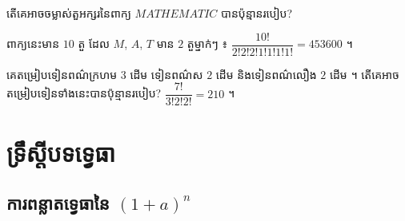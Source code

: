 \begin{example}[លំហាត់គំរូ]
តើគេអាចចម្លាស់តួអក្សរនៃពាក្យ $MATHEMATIC$ បានប៉ុន្មានរបៀប?
\end{example}
\ans
ពាក្យនេះមាន $10$ តួ ដែល $M$, $A$, $T$ មាន $2$ តួម្នាក់ៗ ៖ $\dfrac{10!}{2!2!2!1!1!1!1!} = 453600$ ។

\begin{pro}
គេតម្រៀបទៀនពណ៌ក្រហម $3$ ដើម ទៀនពណ៌ស $2$ ដើម និងទៀនពណ៌លឿង $2$ ដើម ។ តើគេអាចតម្រៀបទៀនទាំងនេះបានប៉ុន្មានរបៀប?
\ans
$\dfrac{7!}{3!2!2!} = 210$ ។
\end{pro}

\section{ទ្រឹស្ដីបទទ្វេធា}
\subsection{ការពន្លាតទ្វេធានៃ \texorpdfstring{$(1 + a)^n$}{(1+a)^n}}

